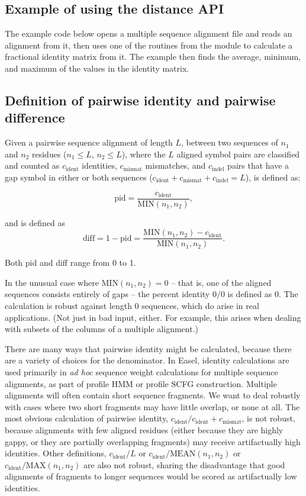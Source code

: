 \subsection{Example of using the distance API}

The example code below opens a multiple sequence alignment file and
reads an alignment from it, then uses one of the routines from the
 module to calculate a fractional identity matrix
from it. The example then finds the average, minimum, and maximum of
the values in the identity matrix.



\subsection{Definition of pairwise identity and pairwise difference}

Given a pairwise sequence alignment of length $L$, between two
sequences of $n_1$ and $n_2$ residues ($n_1 \leq L$, $n_2 \leq L$),
where the $L$ aligned symbol pairs are classified and counted as
$c_{\mbox{ident}}$ identities, $c_{\mbox{mismat}}$ mismatches, and
$c_{\mbox{indel}}$ pairs that have a gap symbol in either or both
sequences ($c_{\mbox{ident}} + c_{\mbox{mismat}} + c_{\mbox{indel}} =
L$),  is defined as:

\[
   \mbox{pid} = \frac{c_{\mbox{ident}}}{\mbox{MIN}(n_1, n_2)},
\]

and  is defined as
\[
   \mbox{diff} = 1 - \mbox{pid} = \frac{\mbox{MIN}(n_1,n_2) - c_{\mbox{ident}}}{\mbox{MIN}(n_1, n_2)}.
\]

Both pid and diff range from 0 to 1. 

In the unusual case where $\mbox{MIN}(n_1,n_2)=0$ -- that is, one of
the aligned sequences consists entirely of gaps -- the percent
identity $0/0$ is defined as 0. The calculation is robust against
length 0 sequences, which do arise in real applications. (Not just in
bad input, either. For example, this arises when dealing with subsets
of the columns of a multiple alignment.)

There are many ways that pairwise identity might be calculated,
because there are a variety of choices for the denominator. In Easel,
identity calculations are used primarily in \emph{ad hoc} sequence
weight calculations for multiple sequence alignments, as part of
profile HMM or profile SCFG construction. Multiple alignments will
often contain short sequence fragments. We want to deal robustly with
cases where two short fragments may have little overlap, or none at
all. The most obvious calculation of pairwise identity,
$c_{\mbox{ident}} / c_{\mbox{ident}} + c_{\mbox{mismat}}$, is not
robust, because alignments with few aligned residues (either because
they are highly gappy, or they are partially overlapping fragments)
may receive artifactually high identities. Other definitions,
$c_{\mbox{ident}} / L$ or $c_{\mbox{ident}} / \mbox{MEAN}(n_1, n_2)$
or $c_{\mbox{ident}} / \mbox{MAX}(n_1, n_2)$ are also not robust,
sharing the disadvantage that good alignments of fragments to longer
sequences would be scored as artifactually low identities.


